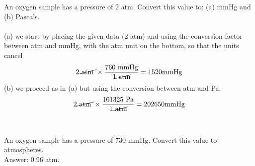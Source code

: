 \documentclass[main.tex]{subfiles}
\begin{document}
\begin{description}
\begin{example} %
An oxygen sample has a pressure of 2 atm. Convert this value to: (a) mmHg and (b) Pascals.
\\
\\
(a) we start by placing the given data (2 atm) and using the conversion factor between atm and mmHg, with the atm unit on the bottom, so that the units cancel
\begin{equation*}
2   \cancel{\text{ atm }} \times
\dfrac{760\text{ mmHg}  } {1\cancel{\text{ atm}}}=1520\text{mmHg}
\end{equation*}
(b) we proceed as in (a) but using the conversion between atm and Pa:
\begin{equation*}
2   \cancel{\text{ atm }} \times
\dfrac{101325\text{ Pa}  } {1\cancel{\text{ atm}}}=202650\text{mmHg}
\end{equation*}
\\
\faDiamond\ \\
An oxygen sample has a pressure of 730 mmHg. Convert this value to atmospheres.
\\
\flushright Answer: 0.96 atm.
\end{example}%

\end{description}
\end{document}
